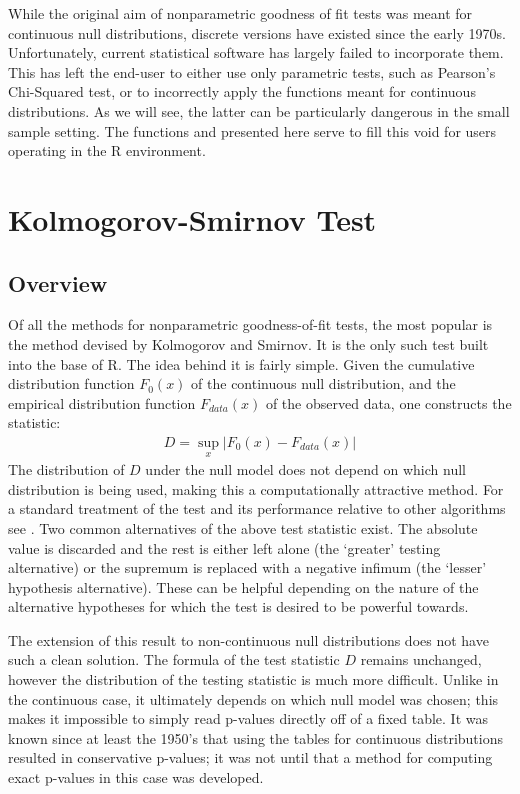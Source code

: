 While the original aim of nonparametric goodness of fit tests was meant for continuous null distributions, discrete versions
have existed since the early 1970s. Unfortunately, current statistical software has largely failed to incorporate them.
This has left the end-user to either use only parametric tests, such as Pearson's Chi-Squared test, or to incorrectly
apply the functions meant for continuous distributions. As we will see, the latter can be particularly dangerous
in the small sample setting. The functions  and  presented here serve to fill this void for users
operating in the R environment. 

\section{Kolmogorov-Smirnov Test}


\subsection{Overview}

Of all the methods for nonparametric goodness-of-fit tests, the most popular is the method devised by Kolmogorov and Smirnov.
It is the only such test built into the base of R. The idea behind it is fairly simple. Given the cumulative distribution
function $F_0(x)$ of the continuous null distribution, and the empirical distribution function $F_{data}(x)$ of the observed data, 
one constructs the statistic:
\begin{align}
D = \sup_x \left| F_0(x)- F_{data}(x) \right|
\end{align}
The distribution of $D$ under the null model does not depend on which null distribution is being used, making this a computationally
attractive method. For a standard treatment of the test and its performance relative to other algorithms see \cite{slakter65}. Two common
alternatives of the above test statistic exist. The absolute value is discarded and the rest is either left alone (the `greater' testing 
alternative) or the supremum is replaced with a negative infimum (the `lesser' hypothesis alternative). These can be helpful depending 
on the nature of the alternative hypotheses for which the test is desired to be powerful towards.

The extension of this result to non-continuous null distributions does not have such a clean solution. The formula of
the test statistic $D$ remains unchanged, however the distribution of the testing statistic is much more difficult. Unlike in the 
continuous case, it ultimately depends on which null model was chosen; this makes it impossible to simply read p-values directly 
off of a fixed table. It was known since at least the 1950's that using the tables for continuous distributions resulted in 
conservative p-values; it was not until \citet{Conover1972} that a method for computing exact p-values in this case was developed.


